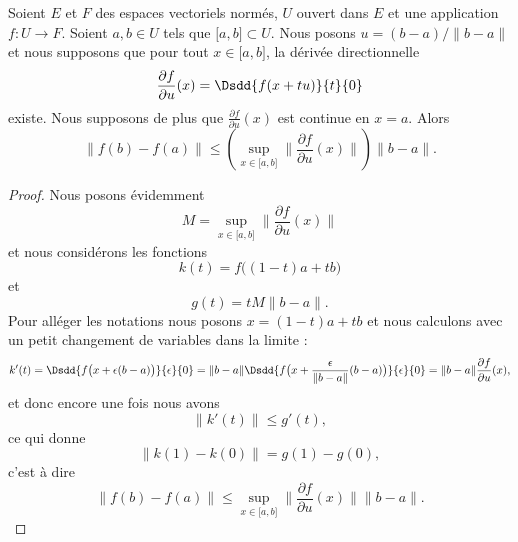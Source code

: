 \begin{proposition} \label{ProFSjmBAt}
    Soient \( E\) et \( F\) des espaces vectoriels normés, \( U \) ouvert dans \( E\) et une application \( f\colon U\to F\). Soient \( a,b\in U\) tels que \( \mathopen[ a , b \mathclose]\subset U\). Nous posons \( u=(b-a)/\| b-a \|\) et nous supposons que pour tout \( x\in\mathopen[ a , b \mathclose]\), la dérivée directionnelle
    \begin{equation}
        \frac{ \partial f }{ \partial u }(x)=\Dsdd{ f(x+tu) }{t}{0}
    \end{equation}
    existe. Nous supposons de plus que \( \frac{ \partial f }{ \partial u }(x)\) est continue en \( x=a\). Alors
    \begin{equation}
        \| f(b)-f(a) \|\leq\left( \sup_{x\in\mathopen[ a , b \mathclose]}\| \frac{ \partial f }{ \partial u }(x) \| \right)\| b-a \|.
    \end{equation}
\end{proposition}

\begin{proof}
    Nous posons évidemment 
    \begin{equation}
        M=\sup_{x\in\mathopen[ a , b \mathclose]}\| \frac{ \partial f }{ \partial u }(x) \| 
    \end{equation}
    et nous considérons les fonctions
    \begin{equation}
        k(t)=f\big( (1-t)a+tb \big)
    \end{equation}
    et
    \begin{equation}
        g(t)=tM\| b-a \|.
    \end{equation}
    Pour alléger les notations nous posons \( x=(1-t)a+tb\) et nous calculons avec un petit changement de variables dans la limite :
    \begin{equation}
        k'(t)=\Dsdd{  f\big( x+\epsilon(b-a) \big)  }{\epsilon}{0}=\| b-a \|\Dsdd{ f\big( x+\frac{ \epsilon }{ \| b-a \| }(b-a) \big) }{\epsilon}{0}=\| b-a \|\frac{ \partial f }{ \partial u }(x),
    \end{equation}
    et donc encore une fois nous avons
    \begin{equation}
        \| k'(t) \|\leq g'(t),
    \end{equation}
    ce qui donne
    \begin{equation}
        \| k(1)-k(0) \|=g(1)-g(0),
    \end{equation}
    c'est à dire
    \begin{equation}
        \| f(b)-f(a) \|\leq \sup_{x\in\mathopen[ a , b \mathclose]}\| \frac{ \partial f }{ \partial u }(x) \|\| b-a \|.
    \end{equation}
\end{proof}


